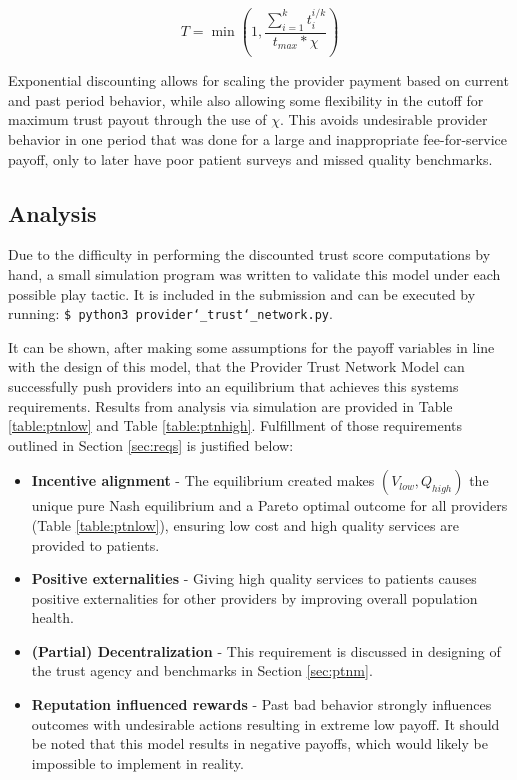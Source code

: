 \documentclass{article}
\begin{document}
\begin{equation}
    T = \min \left( 1, \frac{\sum_{i=1}^k t_i^{i / k}} {t_{max} * \chi} \right)
\end{equation}

Exponential discounting allows for scaling the provider payment based on current and past period behavior, while also allowing some flexibility in the cutoff for maximum trust payout through the use of $\chi$. This avoids undesirable provider behavior in one period that was done for a large and inappropriate fee-for-service payoff, only to later have poor patient surveys and missed quality benchmarks.

\subsection{Analysis}
Due to the difficulty in performing the discounted trust score computations by hand, a small simulation program was written to validate this model under each possible play tactic. It is included in the submission and can be executed by running: \texttt{\$ python3 provider\char`_trust\char`_network.py}.

It can be shown, after making some assumptions for the payoff variables in line with the design of this model, that the Provider Trust Network Model can successfully push providers into an equilibrium that achieves this systems requirements. Results from analysis via simulation are provided in Table \ref{table:ptnlow} and Table \ref{table:ptnhigh}. Fulfillment of those requirements outlined in Section \ref{sec:reqs} is justified below:

\begin{itemize}
    \item \textbf{Incentive alignment} - The equilibrium created makes $(V_{low}, Q_{high})$ the unique pure Nash equilibrium and a Pareto optimal outcome for all providers (Table \ref{table:ptnlow}), ensuring low cost and high quality services are provided to patients.
    \item \textbf{Positive externalities} - Giving high quality services to patients causes positive externalities for other providers by improving overall population health.
    \item \textbf{(Partial) Decentralization} - This requirement is discussed in designing of the trust agency and benchmarks in Section \ref{sec:ptnm}.
    \item \textbf{Reputation influenced rewards} - Past bad behavior strongly influences outcomes with undesirable actions resulting in extreme low payoff. It should be noted that this model results in negative payoffs, which would likely be impossible to implement in reality.
\end{itemize}
\end{document}
